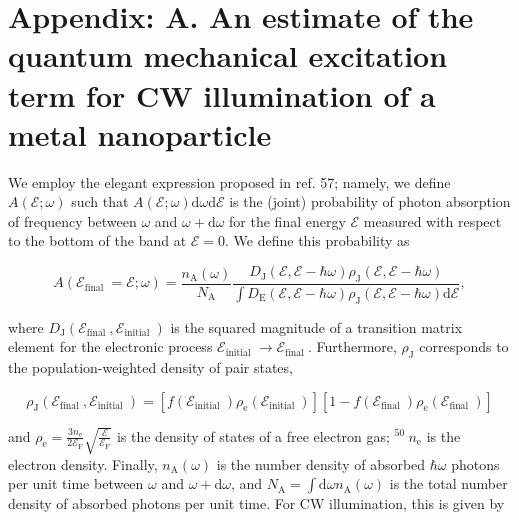 \documentclass[10pt]{article}
\begin{document}
\section*{Appendix: A. An estimate of the quantum mechanical excitation term for CW illumination of a metal nanoparticle}
We employ the elegant expression proposed in ref. 57; namely, we define $A(\mathcal{E} ; \omega)$ such that $A(\mathcal{E} ; \omega) \mathrm{d} \omega \mathrm{d} \mathcal{E}$ is the (joint) probability of photon absorption of frequency between $\omega$ and $\omega+\mathrm{d} \omega$ for the final energy $\mathcal{E}$ measured with respect to the bottom of the band at $\mathcal{E}=0$. We define this probability as


\begin{equation*}
A\left(\mathcal{E}_{\text {final }}=\mathcal{E} ; \omega\right)=\frac{n_{\mathrm{A}}(\omega)}{N_{\mathrm{A}}} \frac{D_{\mathrm{J}}(\mathcal{E}, \mathcal{E}-\hbar \omega) \rho_{\mathrm{J}}(\mathcal{E}, \mathcal{E}-\hbar \omega)}{\int D_{\mathrm{E}}(\mathcal{E}, \mathcal{E}-\hbar \omega) \rho_{\mathrm{J}}(\mathcal{E}, \mathcal{E}-\hbar \omega) \mathrm{d} \mathcal{E}}, \tag{A1}
\end{equation*}


where $D_{\mathrm{J}}\left(\mathcal{E}_{\text {final }}, \mathcal{E}_{\text {initial }}\right)$ is the squared magnitude of a transition matrix element for the electronic process $\mathcal{E}_{\text {initial }} \rightarrow \mathcal{E}_{\text {final }}$. Furthermore, $\rho_{\mathrm{J}}$ corresponds to the population-weighted density of pair states,


\begin{equation*}
\rho_{\mathrm{J}}\left(\mathcal{E}_{\text {final }}, \mathcal{E}_{\text {initial }}\right)=\left[f\left(\mathcal{E}_{\text {initial }}\right) \rho_{\mathrm{e}}\left(\mathcal{E}_{\text {initial }}\right)\right]\left[1-f\left(\mathcal{E}_{\text {final }}\right) \rho_{\mathrm{e}}\left(\mathcal{E}_{\text {final }}\right)\right] \tag{A2}
\end{equation*}


and $\rho_{\mathrm{e}}=\frac{3 n_{\mathrm{e}}}{2 \mathcal{E}_{\mathrm{F}}} \sqrt{\frac{\mathcal{E}}{\mathcal{E}_{\mathrm{F}}}}$ is the density of states of a free electron gas; ${ }^{\text {50 }} n_{\mathrm{e}}$ is the electron density. Finally, $n_{\mathrm{A}}(\omega)$ is the number density of absorbed $\hbar \omega$ photons per unit time between $\omega$ and $\omega+\mathrm{d} \omega$, and $N_{\mathrm{A}}=\int \mathrm{d} \omega n_{\mathrm{A}}(\omega)$ is the total number density of absorbed photons per unit time. For CW illumination, this is given by
\end{document}

